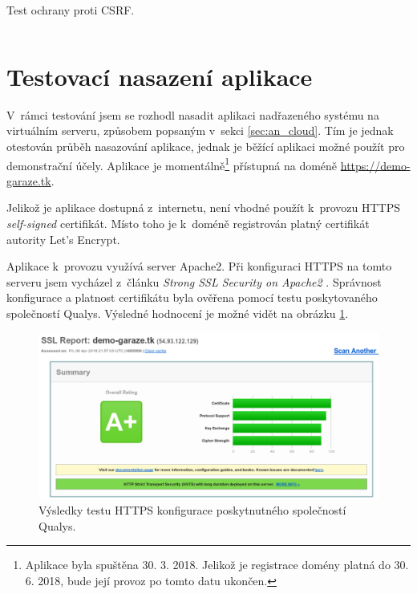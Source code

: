 \begin{listing}[htbp]
\caption{\label{lst:csrf_test} Test ochrany proti CSRF.}
\inputminted[bgcolor=codebg]{python}{source-samples/csrf_test.py}
\end{listing}

\section{Testovací nasazení aplikace}
\label{sec:te_deployment}

V~rámci testování jsem se rozhodl nasadit aplikaci nadřazeného systému na virtuálním serveru, způsobem popsaným v~sekci \ref{sec:an_cloud}. Tím je jednak otestován průběh nasazování aplikace, jednak je běžící aplikaci možné použít pro demonstrační účely. Aplikace je momentálně\footnote{Aplikace byla spuštěna 30. 3. 2018. Jelikož je registrace domény platná do 30. 6. 2018, bude její provoz po tomto datu ukončen.} přístupná na doméně \url{https://demo-garaze.tk}.

Jelikož je aplikace dostupná z~internetu, není vhodné použít k~provozu HTTPS \textit{self-signed} certifikát. Místo toho je k~doméně registrován platný certifikát autority Let's Encrypt.

Aplikace k~provozu využívá server Apache2. Při konfiguraci HTTPS na tomto serveru jsem vycházel z~článku \textit{Strong SSL Security on Apache2} \cite{apache_ssl}. Správnost konfigurace a platnost certifikátu byla ověřena pomocí testu poskytovaného společností Qualys. Výsledné hodnocení je možné vidět na obrázku \ref{fig:ssl_test}.

\begin{figure}[h!]
    \centering
    \includegraphics[width=\textwidth]{images/ssl_test.png}
    \caption[Výsledky testu HTTPS konfigurace]{Výsledky testu HTTPS konfigurace poskytnutného společností Qualys.}
    \label{fig:ssl_test}
\end{figure}


